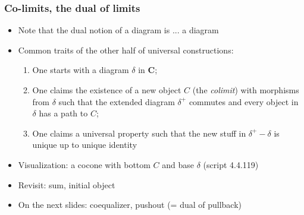 \documentclass[handout]{beamer}
\newcommand{\bfsf}[1]{{\boldsymbol{#1}}}
\newcommand{\CC}{\bfsf{C}}
\begin{document}
\frame
  {   
    \frametitle{Co-limits, the dual of limits}\label{Ch4:CoLimits}

 \begin{itemize}[<+->]
\item Note that the dual notion of a diagram is ... a diagram
\item Common traits of the other half of universal constructions:
 \begin{enumerate}
    \item One starts with a diagram $\delta$ in $\CC$;
    \item One claims the existence of a new object $C$ (the \emph{{\color{red}colimit}}) with 
morphisms {\color{red}from} $\delta$ such that the extended diagram $\delta^+$ commutes
and every object in $\delta$ {\color{red} has a path to} $C$;
    \item One claims a universal property such that the new stuff in
$\delta^+-\delta$ is unique up to unique identity
 \end{enumerate}
\item Visualization: a cocone with bottom $C$ and base $\delta$ (script 4.4.119)
\item Revisit: sum, initial object
\item On the next slides: 
coequalizer, pushout (= dual of pullback)

\end{itemize}

 }
\end{document}
